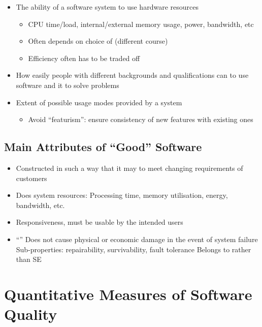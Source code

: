 \begin{defBox}[title=External quality facotrs\, perceived by Costomer or User]
\begin{itemize}
        \item {} The ability of a software system to use hardware resources 
        \begin{itemize}
            \item CPU time/load, internal/external memory usage, power, bandwidth, etc
            \item Often depends on choice of  (different course)
            \item {} Efficiency often has to be traded off
        \end{itemize}
        \item {} How easily people with different backgrounds and qualifications can  to use software and  it to solve problems
        \item {} Extent of possible usage modes provided by a system
        \begin{itemize}
            \item Avoid \enquote{featurism}: ensure consistency of new features with existing ones
        \end{itemize}
    \end{itemize}
\end{defBox}
\subsection{Main Attributes of \enquote{Good} Software}
\begin{itemize}
    \item {} Constructed in such a way that it may  to meet changing requirements of customers
    \item {} Does  system resources: Processing time, memory utilisation, energy, bandwidth, etc.
    \item {} Responsiveness, must be usable by the intended users
    \item {} \enquote{} Does not cause physical or economic damage in the event of system failure\\
    Sub-properties: repairability, survivability, fault tolerance Belongs to  rather than SE
\end{itemize}

\section{Quantitative Measures of Software Quality}

